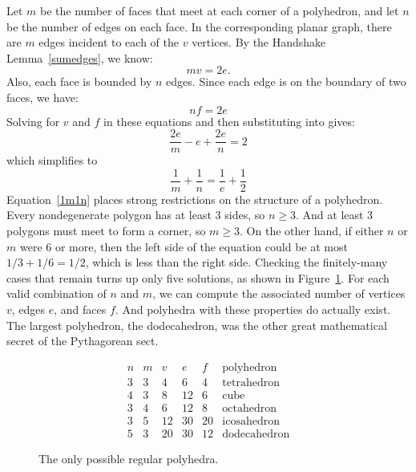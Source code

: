 Let $m$ be the number of faces that meet at each corner of a
polyhedron, and let $n$ be the number of edges on each face.  In the
corresponding planar graph, there are $m$ edges incident to each of
the $v$ vertices.  By the Handshake Lemma~\ref{sumedges}, we
know:
%
\[
m v = 2 e.
\]
%
Also, each face is bounded by $n$ edges.  Since each edge is on the
boundary of two faces, we have:
%
\[
n f = 2 e
\]
%
Solving for $v$ and $f$ in these equations and then substituting into
 gives:
\[
\frac{2e}{m} - e + \frac{2e}{n} = 2
\]
which simplifies to
\begin{equation}\label{1m1n}
\frac{1}{m} + \frac{1}{n} = \frac{1}{e} + \frac{1}{2}
\end{equation}
%
Equation~\ref{1m1n} places strong restrictions on the structure of a
polyhedron.  Every nondegenerate polygon has at least 3 sides, so $n
\geq 3$.  And at least 3 polygons must meet to form a corner, so $m
\geq 3$.  On the other hand, if either $n$ or $m$ were 6 or more, then
the left side of the equation could be at most $1/3 + 1/6 = 1/2$,
which is less than the right side.  Checking the finitely-many cases
that remain turns up only five solutions, as shown in
Figure~\ref{fig:5DR}.  For each valid combination of $n$ and $m$, we
can compute the associated number of vertices $v$, edges $e$, and
faces $f$.  And polyhedra with these properties do actually exist.
The largest polyhedron, the dodecahedron, was the other great
mathematical secret of the Pythagorean sect.

\begin{figure}\redrawntrue


\[
\begin{array}{cc|ccc|l}
n & m & v  & e  &  f & \text{polyhedron} \\ \hline
3 & 3 & 4  & 6  &  4 & \text{tetrahedron} \\
4 & 3 & 8  & 12 &  6 & \text{cube} \\
3 & 4 & 6  & 12 &  8 & \text{octahedron} \\
3 & 5 & 12 & 30 & 20 & \text{icosahedron} \\
5 & 3 & 20 & 30 & 12 & \text{dodecahedron}
\end{array}
\]

\caption{The only possible regular polyhedra.}

\label{fig:5DR}

\end{figure}


